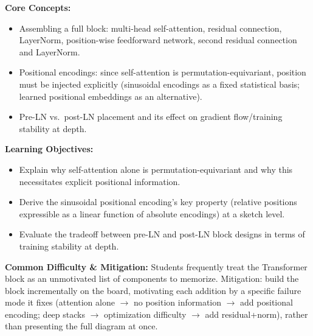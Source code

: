 \documentclass[11pt]{article}
\begin{document}
\textbf{Core Concepts:}
\begin{itemize}
  \item Assembling a full block: multi-head self-attention, residual connection, LayerNorm, position-wise feedforward network, second residual connection and LayerNorm.
  \item Positional encodings: since self-attention is permutation-equivariant, position must be injected explicitly (sinusoidal encodings as a fixed statistical basis; learned positional embeddings as an alternative).
  \item Pre-LN vs.\ post-LN placement and its effect on gradient flow/training stability at depth.
\end{itemize}

\textbf{Learning Objectives:}
\begin{itemize}
  \item Explain why self-attention alone is permutation-equivariant and why this necessitates explicit positional information.
  \item Derive the sinusoidal positional encoding's key property (relative positions expressible as a linear function of absolute encodings) at a sketch level.
  \item Evaluate the tradeoff between pre-LN and post-LN block designs in terms of training stability at depth.
\end{itemize}

\textbf{Common Difficulty \& Mitigation:} Students frequently treat the Transformer block as an unmotivated list of components to memorize. Mitigation: build the block incrementally on the board, motivating each addition by a specific failure mode it fixes (attention alone $\to$ no position information $\to$ add positional encoding; deep stacks $\to$ optimization difficulty $\to$ add residual+norm), rather than presenting the full diagram at once.
\end{document}
